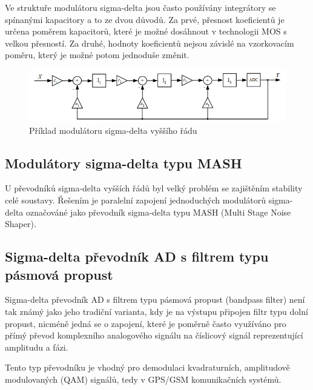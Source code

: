 Ve struktuře modulátoru sigma-delta jsou často používány integrátory se spínanými kapacitory a to ze dvou důvodů. Za prvé, přesnost koeficientů je určena poměrem kapacitorů, které je možné dosáhnout v technologii MOS s velkou přesností. Za druhé, hodnoty koeficientů nejsou závislé na vzorkovacím poměru, který je možné potom jednoduše změnit.
\begin{figure}[h]
   \begin{center}
     \includegraphics[scale=0.6]{images/sigmamulti.png}
   \end{center}
   \caption{Příklad modulátoru sigma-delta vyššího řádu}
\end{figure}

\subsection{Modulátory sigma-delta typu MASH}
U převodníků sigma-delta vyšších řádů byl velký problém se zajištěním stability celé soustavy. Řešením je paralelní zapojení jednoduchých modulátorů sigma-delta označováné jako převodník sigma-delta typu MASH (Multi Stage Noise Shaper).

\subsection{Sigma-delta převodník AD s filtrem typu pásmová propust}

Sigma-delta převodník AD s filtrem typu pásmová propust (bandpass filter) není tak známý jako jeho tradiční varianta, kdy je na výstupu připojen filtr typu dolní propust, nicméně jedná se o zapojení, které je poměrně často využíváno pro přímý převod komplexního analogového signálu na číslicový signál reprezentující amplitudu a fázi.

Tento typ převodníku je vhodný pro demodulaci kvadraturních, amplitudově modulovaných (QAM) signálů, tedy v GPS/GSM komunikačních systémů.


